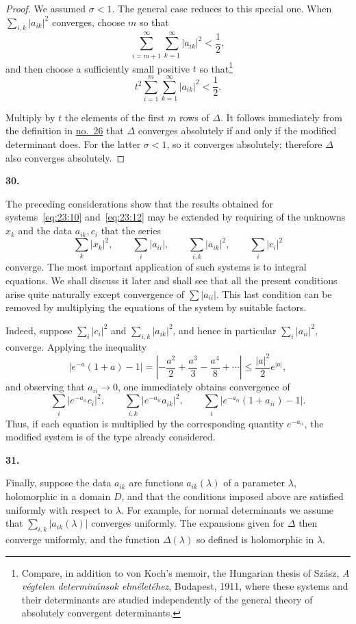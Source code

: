 \documentclass[
  paper=b5,
  fontsize=13pt,
  twoside=true,
  open=any,
  bookmarkpackage=false,
  chapterprefix=true,
  headings=normal
]{scrbook}
\theoremstyle{definition}
\newcommand{\numberedparagraph}[1]{%
  \par\medskip\phantomsection\label{sec:#1}%
  \noindent\textbf{#1.}\enspace
}
\begin{document}
\begin{proof}
We assumed $\sigma<1$. The general case reduces to this special one. When $\sum_{i,k}|a_{ik}|^2$ converges, choose $m$ so that
\[
 \sum_{i=m+1}^{\infty}\sum_{k=1}^{\infty}|a_{ik}|^2<\frac12,
\]
and then choose a sufficiently small positive $t$ so that\footnote{Compare, in addition to von Koch's memoir, the Hungarian thesis of Sz\'asz, \emph{A v\'egtelen determin\'ansok elm\'elet\'ehez}, Budapest, 1911, where these systems and their determinants are studied independently of the general theory of absolutely convergent determinants.}
\[
 t^2\sum_{i=1}^{m}\sum_{k=1}^{\infty}|a_{ik}|^2<\frac12.
\]

Multiply by $t$ the elements of the first $m$ rows of $\Delta$. It follows immediately from the definition in \hyperref[sec:26]{no.~26} that $\Delta$ converges absolutely if and only if the modified determinant does. For the latter $\sigma<1$, so it converges absolutely; therefore $\Delta$ also converges absolutely.
\end{proof}

\numberedparagraph{30}
The preceding considerations show that the results obtained for systems~\eqref{eq:23:10} and~\eqref{eq:23:12} may be extended by requiring of the unknowns $x_k$ and the data $a_{ik},c_i$ that the series
\[
 \sum_k|x_k|^2,\qquad \sum_i|a_{ii}|,\qquad
 \sum_{i,k}|a_{ik}|^2,\qquad \sum_i|c_i|^2
\]
 converge. The most important application of such systems is to integral equations. We shall discuss it later and shall see that all the present conditions arise quite naturally except convergence of $\sum|a_{ii}|$. This last condition can be removed by multiplying the equations of the system by suitable factors.

Indeed, suppose $\sum_i|c_i|^2$ and $\sum_{i,k}|a_{ik}|^2$, and hence in particular $\sum_i|a_{ii}|^2$, converge. Applying the inequality
\[
 |e^{-a}(1+a)-1|
 =\left|-\frac{a^2}{2}+\frac{a^3}{3}-\frac{a^4}{8}+\cdots\right|
 \leq\frac{|a|^2}{2}e^{|a|},
\]
and observing that $a_{ii}\to0$, one immediately obtains convergence of
\[
 \sum_i|e^{-a_{ii}}c_i|^2,\qquad
 \sum_{i,k}|e^{-a_{ii}}a_{ik}|^2,
 \qquad
 \sum_i|e^{-a_{ii}}(1+a_{ii})-1|.
\]
Thus, if each equation is multiplied by the corresponding quantity $e^{-a_{ii}}$, the modified system is of the type already considered.

\numberedparagraph{31}
Finally, suppose the data $a_{ik}$ are functions $a_{ik}(\lambda)$ of a parameter $\lambda$, holomorphic in a domain $D$, and that the conditions imposed above are satisfied uniformly with respect to $\lambda$. For example, for normal determinants we assume that $\sum_{i,k}|a_{ik}(\lambda)|$ converges uniformly. The expansions given for $\Delta$
then converge uniformly, and the function $\Delta(\lambda)$ so defined is holomorphic in $\lambda$.
\end{document}
